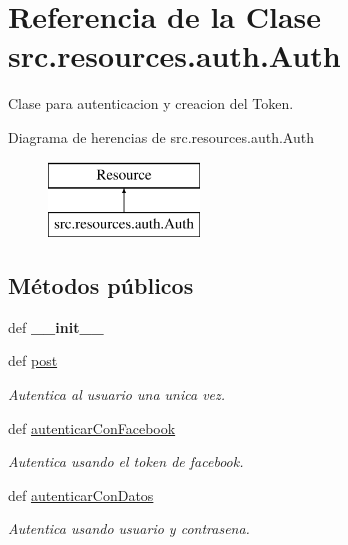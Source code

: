 \hypertarget{classsrc_1_1resources_1_1auth_1_1_auth}{\section{Referencia de la Clase src.\-resources.\-auth.\-Auth}
\label{classsrc_1_1resources_1_1auth_1_1_auth}
}


Clase para autenticacion y creacion del Token.  


Diagrama de herencias de src.\-resources.\-auth.\-Auth\begin{figure}[H]
\begin{center}
\leavevmode
\includegraphics[height=2.000000cm]{classsrc_1_1resources_1_1auth_1_1_auth}
\end{center}
\end{figure}
\subsection*{Métodos públicos}
\begin{DoxyCompactItemize}
\item 
\hypertarget{classsrc_1_1resources_1_1auth_1_1_auth_a2d64661c266e0acecb9f982c74c255bf}{def {\bfseries \-\_\-\-\_\-init\-\_\-\-\_\-}}\label{classsrc_1_1resources_1_1auth_1_1_auth_a2d64661c266e0acecb9f982c74c255bf}

\item 
def \hyperlink{classsrc_1_1resources_1_1auth_1_1_auth_a1dc17d25fd4327120f782367cad81b39}{post}
\begin{DoxyCompactList}\small\item\em Autentica al usuario una unica vez. \end{DoxyCompactList}\item 
def \hyperlink{classsrc_1_1resources_1_1auth_1_1_auth_aa762d1e74c61ff281bb9a4a9feaf58ed}{autenticar\-Con\-Facebook}
\begin{DoxyCompactList}\small\item\em Autentica usando el token de facebook. \end{DoxyCompactList}\item 
def \hyperlink{classsrc_1_1resources_1_1auth_1_1_auth_af2d497f457453709da08bfbf745b16c9}{autenticar\-Con\-Datos}
\begin{DoxyCompactList}\small\item\em Autentica usando usuario y contrasena. \end{DoxyCompactList}\end{DoxyCompactItemize}
